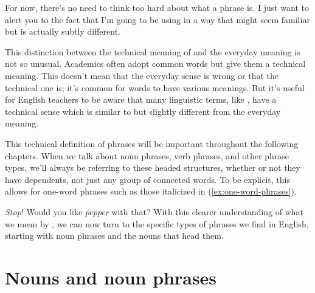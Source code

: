 For now, there's no need to think too hard about what a phrase is. I just want to alert you to the fact that I'm going to be using  in a way that might seem familiar but is actually subtly different.

This distinction between the technical meaning of  and the everyday meaning is not so unusual. Academics often adopt common words but give them a technical meaning. This doesn't mean that the everyday sense is wrong or that the technical one is; it's common for words to have various meanings. But it's useful for English teachers to be aware that many linguistic terms, like , have a technical sense which is similar to but slightly different from the everyday meaning.

This technical definition of phrases will be important throughout the following chapters. When we talk about noun phrases, verb phrases, and other phrase types, we'll always be referring to these headed structures, whether or not they have dependents, not just any group of connected words. To be explicit, this allows for one-word phrases such as those italicized in (\ref{ex:one-word-phrases}).

\ea \label{ex:one-word-phrases}
    \ea \emph{Stop}!
    \ex Would you like \emph{pepper} with that?
\z\z
With this clearer understanding of what we mean by , we can now turn to the specific types of phrases we find in English, starting with noun phrases and the nouns that head them.

\section{Nouns and noun phrases}\label{sec:nouns}



